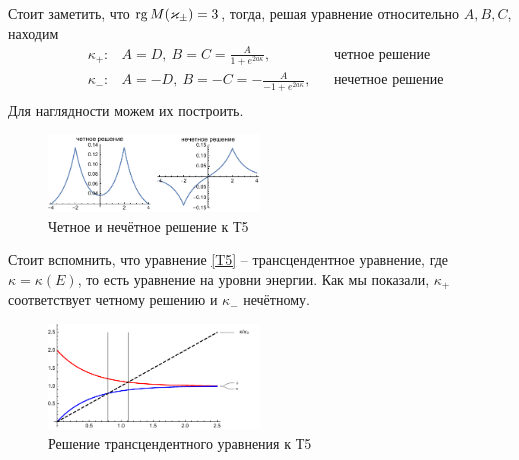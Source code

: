 Стоит заметить, что $\mathop{\mathrm{rg}}\nolimits M (\varkappa_{\pm}) = 3$, тогда, решая уравнение относительно $A, B, C$, находим
\begin{align*}
    &\kappa_+ \colon 
    &A = D, \ B=C=\frac{A}{1 + e^{2 a \kappa}}, 
    &&\text{четное решение} \\ 
    &\kappa_- \colon 
    &A = -D, \ B=-C=-\frac{A}{-1 + e^{2 a \kappa}}, 
    &&\text{нечетное решение} \\ 
\end{align*}
Для наглядности можем их построить.
\begin{figure}[ht]
    \centering
    \includegraphics[width=0.5\textwidth]{figures/T5.pdf}
    \caption{Четное и нечётное решение к Т5}
\end{figure}


Стоит вспомнить, что уравнение \eqref{T5} -- трансцендентное уравнение, где $\kappa = \kappa(E)$, то есть уравнение на уровни энергии. Как мы показали, $\kappa_+$ соответствует четному решению и $\kappa_-$ нечётному. 


\begin{figure}[ht]
    \centering
    \includegraphics[width=0.5\textwidth]{figuresT5_fig2.pdf}
    \caption{Решение трансцендентного уравнения к Т5}
\end{figure}
